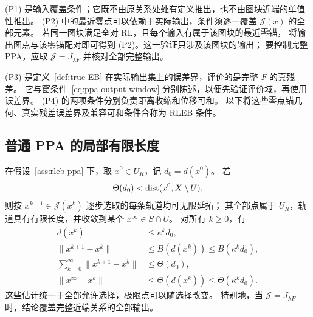 (P1) 是输入覆盖条件；它既不由原关系处处有定义推出，也不由图块近端的单值性推出。
(P2) 中的最近零点可以依赖于实际输出，条件须逐一覆盖 $\mathcal J(x)$ 的全部元素。
若同一图块满足全对 RL，且每个输入有属于该图块的最近零锚，
将输出图点与该零锚配对即可得到 (P2)。这一验证只涉及该图块的输出；
要控制完整 PPA，应取 $\mathcal J=J_{\lambda F}$ 并核对全部完整输出。

(P3) 是定义~\ref{def:true-EB} 在实际输出集上的误差界，评价的是完整 $F$ 的真残差。
它与窗条件~\eqref{eq:ppa-output-window} 分别陈述，以便先验证评价域，再使用误差界。
(P4) 的两项条件分别负责距离收缩和位移可和。
以下将这些零点锚几何、真实残差误差界及兼容可和条件合称为 RLEB 条件。

\subsection{普通 PPA 的局部有限长度}

\begin{theorem}[全部允许选择的局部收敛]
\label{thm:selection-RLEB}
\label{thm:rleb-ppa-general}
在假设~\ref{ass:rleb-ppa} 下，取 $x^0\in U_R$，记 $d_0=d(x^0)$。
若
\begin{equation}
\label{eq:direct-localization}
 \Theta(d_0)<\operatorname{dist}(x^0,X\setminus U),
\end{equation}
则按 $x^{k+1}\in\mathcal J(x^k)$ 逐步选取的每条轨道均可无限延拓；
其全部点属于 $U_R$，轨道具有有限长度，并收敛到某个 $x^\infty\in S\cap U$。
对所有 $k\ge0$，有
\begin{align}
 d(x^k)&\le\kappa^kd_0,\label{eq:ppa-distance-rate}\\
 \|x^{k+1}-x^k\|&\le B(d(x^k))\le B(\kappa^kd_0),\label{eq:ppa-step-rate}\\
 \sum_{k=0}^{\infty}\|x^{k+1}-x^k\|&\le\Theta(d_0),\label{eq:ppa-total-length}\\
 \|x^\infty-x^k\|&\le\Theta(d(x^k))\le\Theta(\kappa^kd_0).
 \label{eq:ppa-tail-bound}
\end{align}
这些估计统一于全部允许选择，极限点可以随选择改变。
特别地，当 $\mathcal J=J_{\lambda F}$ 时，结论覆盖完整近端关系的全部输出。
\end{theorem}

